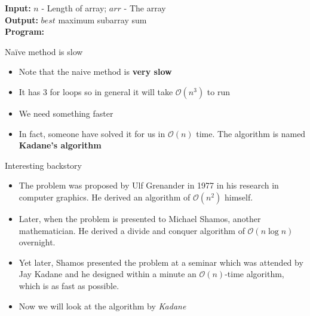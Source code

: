 \documentclass[10pt,xcolor={table,dvipsnames},t]{beamer}
\begin{document}
\begin{frame}
  \begin{algorithm}[H]
    \caption{Maximum subarray sum (Naïve)} \label{alg:max_subarr_naive}
    \begin{flushleft}
      \textbf{Input:} $n$ - Length of array; $arr$ - The array \\
      \textbf{Output:} $best$ maximum subarray sum\\
      \textbf{Program:} 
    \end{flushleft}
    
    \begin{algorithmic}
          \EndFor
        \EndFor
      \EndFor
    \end{algorithmic}
  \end{algorithm}
\end{frame}

\begin{frame}{Naïve method is slow}
  \begin{itemize}
    \item Note that the naive method is \textbf{very slow}
    \item It has 3 for loops so in general it will take $\mathcal{O}(n^3)$ to run
    \item We need something faster
    \item In fact, someone have solved it for us in $\mathcal{O}(n)$ time. The algorithm is named \textbf{Kadane's algorithm}
  \end{itemize}
\end{frame}

\begin{frame}{Interesting backstory}
  \begin{itemize}
    \item The problem was proposed by Ulf Grenander in 1977 in his research in computer graphics. He derived an algorithm of $\mathcal{O}(n^2)$ himself.
    \item Later, when the problem is presented to Michael Shamos, another mathematician. He derived a divide and conquer algorithm of $\mathcal{O}(n\log n)$ overnight.
    \item Yet later, Shamos presented the problem at a seminar which was attended by Jay Kadane and he designed within a minute an $\mathcal{O}(n)$-time algorithm, which is as fast as possible.
    \item Now we will look at the algorithm by \textit{Kadane}
  \end{itemize}
\end{frame}
\end{document}
